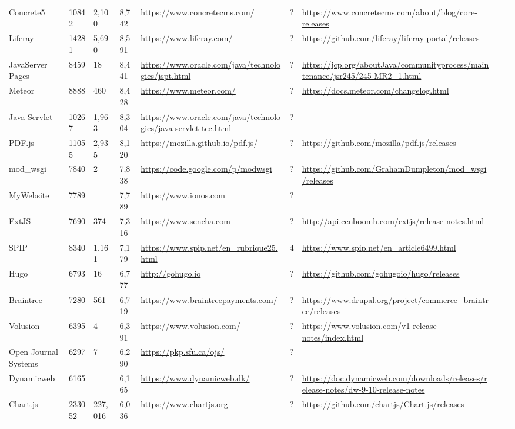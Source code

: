 \begin{table}[!htp]
\begin{tabular}{|l|l|l|l|l|l|l|l|l|}
				Concrete5 &10842 &2,100 &8,742 &\ul{https://www.concretecms.com/} &? &\ul{https://www.concretecms.com/about/blog/core-releases} & \\
				Liferay &14281 &5,690 &8,591 &\ul{https://www.liferay.com/} &? &\ul{https://github.com/liferay/liferay-portal/releases} & \\
				JavaServer Pages &8459 &18 &8,441 &\ul{https://www.oracle.com/java/technologies/jspt.html} &? &\ul{https://jcp.org/aboutJava/communityprocess/maintenance/jsr245/245-MR2\_1.html} & \\
				Meteor &8888 &460 &8,428 &\ul{https://www.meteor.com/} &? &\ul{https://docs.meteor.com/changelog.html} & \\
				Java Servlet &10267 &1,963 &8,304 &\ul{https://www.oracle.com/java/technologies/java-servlet-tec.html} &? & & \\
				PDF.js &11055 &2,935 &8,120 &\ul{https://mozilla.github.io/pdf.js/} &? &\ul{https://github.com/mozilla/pdf.js/releases} & \\
				mod\_wsgi &7840 &2 &7,838 &\ul{https://code.google.com/p/modwsgi} &? &\ul{https://github.com/GrahamDumpleton/mod\_wsgi/releases} & \\
				MyWebsite &7789 & &7,789 &\ul{https://www.ionos.com} &? & & \\
				ExtJS &7690 &374 &7,316 &\ul{https://www.sencha.com} &? &\ul{http://api.cenboomh.com/extjs/release-notes.html} & \\
				SPIP &8340 &1,161 &7,179 &\ul{https://www.spip.net/en\_rubrique25.html} &4 &\ul{https://www.spip.net/en\_article6499.html} & \\
				Hugo &6793 &16 &6,777 &\ul{http://gohugo.io} &? &\ul{https://github.com/gohugoio/hugo/releases} & \\
				Braintree &7280 &561 &6,719 &\ul{https://www.braintreepayments.com/} &? &\ul{https://www.drupal.org/project/commerce\_braintree/releases} & \\
				Volusion &6395 &4 &6,391 &\ul{https://www.volusion.com/} &? &\ul{https://www.volusion.com/v1-release-notes/index.html} & \\
				Open Journal Systems &6297 &7 &6,290 &\ul{https://pkp.sfu.ca/ojs/} &? & & \\
				Dynamicweb &6165 & &6,165 &\ul{https://www.dynamicweb.dk/} &? &\ul{https://doc.dynamicweb.com/downloads/releases/release-notes/dw-9-10-release-notes} & \\
				Chart.js &233052 &227,016 &6,036 &\ul{https://www.chartjs.org} &? &\ul{https://github.com/chartjs/Chart.js/releases} & \\

\end{tabular}
\end{table}
